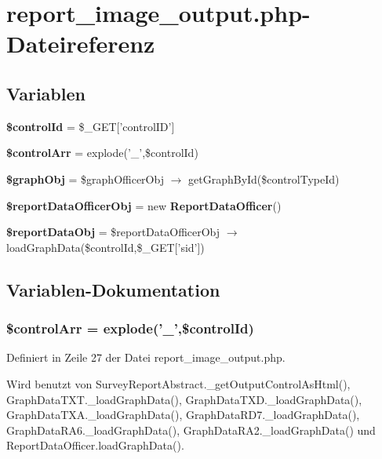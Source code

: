 \section{report\_\-image\_\-output.php-Dateireferenz}
\label{report__image__output_8php}
\subsection*{Variablen}
\begin{CompactItemize}
\item 
{\bf \$controlId} = \$\_\-GET['controlID']
\item 
{\bf \$controlArr} = explode('\_\-',\$controlId)
\item 
{\bf \$graphObj} = \$graphOfficerObj $\rightarrow$ getGraphById(\$controlTypeId)
\item 
{\bf \$reportDataOfficerObj} = new {\bf ReportDataOfficer}()
\item 
{\bf \$reportDataObj} = \$reportDataOfficerObj $\rightarrow$ loadGraphData(\$controlId,\$\_\-GET['sid'])
\end{CompactItemize}


\subsection{Variablen-Dokumentation}
\subsubsection{\setlength{\rightskip}{0pt plus 5cm}\$controlArr = explode('\_\-',\$controlId)}\label{report__image__output_8php_db10ad307898932b74780ecd311b2c77}




Definiert in Zeile 27 der Datei report\_\-image\_\-output.php.

Wird benutzt von SurveyReportAbstract.\_\-getOutputControlAsHtml(), GraphDataTXT.\_\-loadGraphData(), GraphDataTXD.\_\-loadGraphData(), GraphDataTXA.\_\-loadGraphData(), GraphDataRD7.\_\-loadGraphData(), GraphDataRA6.\_\-loadGraphData(), GraphDataRA2.\_\-loadGraphData() und ReportDataOfficer.loadGraphData().
